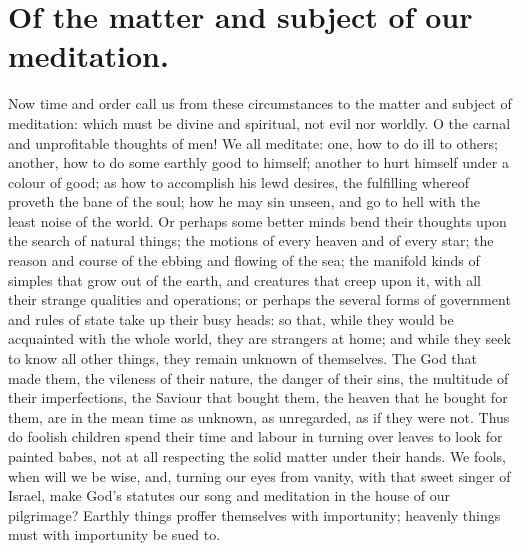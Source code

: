 \chapter{Of the matter and subject of our meditation.}
Now time and order call us from these circumstances to the matter and subject of meditation: which must be divine and spiritual, not evil nor worldly. O the carnal and unprofitable thoughts of men! We all meditate: one, how to do ill to others; another, how to do some earthly good to himself; another to hurt himself under a colour of good; as how to accomplish his lewd desires, the fulfilling whereof proveth the bane of the soul; how he may sin unseen, and go to hell with the least noise of the world. Or perhaps some better minds bend their thoughts upon the search of natural things; the motions of every heaven and of every star; the reason and course of the ebbing and flowing of the sea; the manifold kinds of simples that grow out of the earth, and creatures that creep upon it, with all their strange qualities and operations; or perhaps the several forms of government and rules of state take up their busy heads: so that, while they would be acquainted with the whole world, they are strangers at home; and while they seek to know all other things, they remain unknown of themselves. The God that made them, the vileness of their nature, the danger of their sins, the multitude of their imperfections, the Saviour that bought them, the heaven that he bought for them, are in the mean time as unknown, as unregarded, as if they were not. Thus do foolish children spend their time and labour in turning over leaves to look for painted babes, not at all respecting the solid matter under their hands. We fools, when will we be wise, and, turning our eyes from vanity, with that sweet singer of Israel, make God's statutes our song and meditation in the house of our pilgrimage? Earthly things proffer themselves with importunity; heavenly things must with importunity be sued to. 

